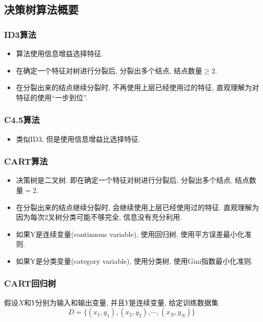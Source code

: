 \subsection{决策树算法概要}

\subsubsection{ID3算法}
\begin{itemize}
    \item 算法使用信息增益选择特征.
    \item 在确定一个特征对树进行分裂后, 分裂出多个结点, 结点数量$\geq 2$.
    \item 在分裂出来的结点继续分裂时, 不再使用上层已经使用过的特征, 直观理解为对特征的使用“一步到位”.
\end{itemize}

\subsubsection{C4.5算法}
\begin{itemize}
    \item 类似ID3, 但是使用信息增益比选择特征.
\end{itemize}

\subsubsection{CART算法}
\begin{itemize}
    \item 决策树是二叉树. 即在确定一个特征对树进行分裂后, 分裂出多个结点, 结点数量$=2$.
    \item 在分裂出来的结点继续分裂时, 会继续使用上层已经使用过的特征. 直观理解为因为每次2叉树分类可能不够完全, 信息没有充分利用.
    \item 如果Y是连续变量(continuous variable), 使用回归树, 使用平方误差最小化准则.
    \item 如果Y是分类变量(category variable), 使用分类树, 使用Gini指数最小化准则.
\end{itemize}

\subsubsection{CART回归树}
假设$X$和$Y$分别为输入和输出变量, 并且$Y$是连续变量, 给定训练数据集
\begin{equation*}
    D = \{(x_1, y_1), (x_2, y_2), \cdots, (x_N, y_N)\}
\end{equation*}

